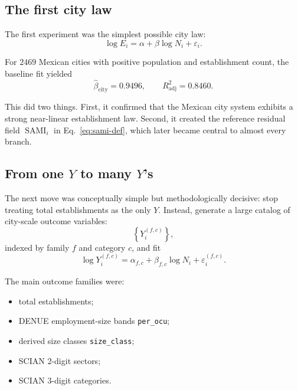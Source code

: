 \documentclass[11pt]{article}
\newcommand{\SAMI}{\operatorname{SAMI}}
\newcommand{\adjR}{R^2_{\mathrm{adj}}}
\begin{document}
\subsection{The first city law}

The first experiment was the simplest possible city law:
\begin{equation}
\log E_i = \alpha + \beta \log N_i + \varepsilon_i.
\label{eq:city-total-law}
\end{equation}

For \(2469\) Mexican cities with positive population and establishment count, the baseline fit yielded
\begin{equation}
\widehat{\beta}_{\mathrm{city}} = 0.9496,
\qquad
\adjR = 0.8460.
\end{equation}

This did two things. First, it confirmed that the Mexican city system exhibits a strong near-linear establishment law. Second, it created the reference residual field \(\SAMI_i\) in Eq.~\eqref{eq:sami-def}, which later became central to almost every branch.

\subsection{From one \(Y\) to many \(Y\)'s}

The next move was conceptually simple but methodologically decisive: stop treating total establishments as the only \(Y\). Instead, generate a large catalog of city-scale outcome variables:
\begin{equation}
\left\{
Y_i^{(f,c)}
\right\},
\end{equation}
indexed by family \(f\) and category \(c\), and fit
\begin{equation}
\log Y_i^{(f,c)} = \alpha_{f,c} + \beta_{f,c}\log N_i + \varepsilon_{i}^{(f,c)}.
\label{eq:family-law}
\end{equation}

The main outcome families were:
\begin{itemize}
\item total establishments;
\item DENUE employment-size bands \texttt{per\_ocu};
\item derived size classes \texttt{size\_class};
\item SCIAN 2-digit sectors;
\item SCIAN 3-digit categories.
\end{itemize}
\end{document}
